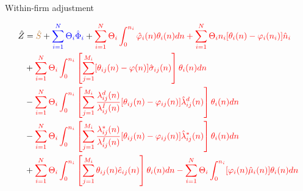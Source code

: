 \documentclass{beamer}
\begin{document}
\begin{frame}{Within-firm adjustment}
	\begin{small}
	\begin{equation}
		\begin{aligned}
			\hat{Z} &= {\textcolor{brown}{\hat{S}}} + {\textcolor{blue}{\sum_{i=1}^N\Theta_i\hat{\Phi}_i}} + {\textcolor{red}{\sum_{i=1}^N\Theta_i\int_0^{n_i}\hat{\varphi}_i(n)\theta_i(n)dn + \sum_{i=1}^N\Theta_in_i[\theta_i(n)-\varphi_i(n_i)]\hat{n}_i}} \\
			&+ {\textcolor{red}{\sum_{i=1}^N\Theta_i\int_0^{n_i}\left[\sum_{j=1}^{M_i}[\theta_{ij}(n)-\varphi(n)]\hat{\sigma}_{ij}(n)\right]\theta_i(n)dn}} \\
			&- {\textcolor{red}{\sum_{i=1}^N\Theta_i\int_0^{n_i}\left[\sum_{j=1}^{M_i}\frac{\lambda_{ij}^d(n)}{\lambda_{ij}^I(n)}[\theta_{ij}(n)-\varphi_{ij}(n)]\hat{\lambda}_{ij}^d(n)\right]\theta_i(n)dn}} \\
			&- {\textcolor{red}{\sum_{i=1}^N\Theta_i\int_0^{n_i}\left[\sum_{j=1}^{M_i}\frac{\lambda_{ij}^*(n)}{\lambda_{ij}^I(n)}[\theta_{ij}(n)-\varphi_{ij}(n)]\hat{\lambda}_{ij}^*(n)\right]\theta_i(n)dn}} \\
			&+ {\textcolor{red}{\sum_{i=1}^N\Theta_i\int_0^{n_i}\left[\sum_{j=1}^{M_i}\theta_{ij}(n)\hat{e}_{ij}(n)\right]\theta_i(n)dn - \sum_{i=1}^N\Theta_i\int_0^{n_i}[\varphi_i(n)\hat{\mu}_i(n)]\theta_i(n)dn}}
		\end{aligned}
	\end{equation}
	\end{small}
\end{frame}
\end{document}
